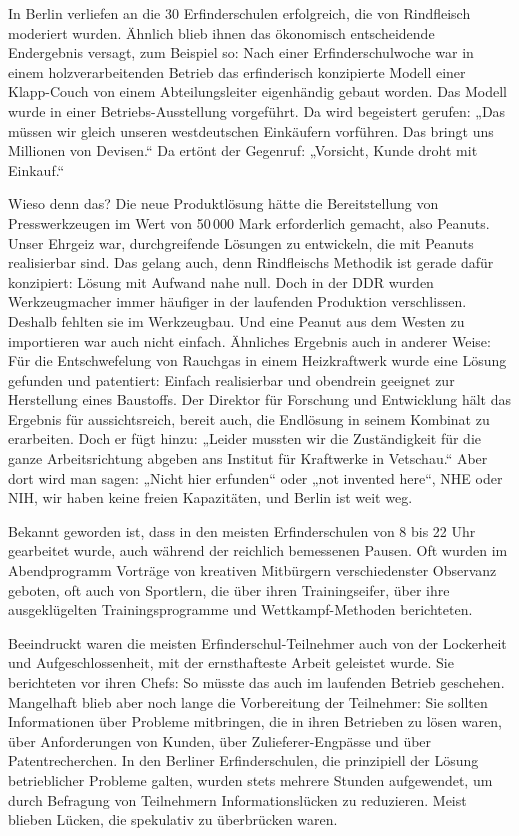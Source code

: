 \documentclass[12pt,a4paper]{article}
\begin{document}
In Berlin verliefen an die 30 Erfinderschulen erfolgreich, die von Rindfleisch
moderiert wurden. Ähnlich blieb ihnen das ökonomisch entscheidende Endergebnis
versagt, zum Beispiel so: Nach einer Erfinderschulwoche war in einem
holzverarbeitenden Betrieb das erfinderisch konzipierte Modell einer
Klapp-Couch von einem Abteilungsleiter eigenhändig gebaut worden. Das Modell
wurde in einer Betriebs-Ausstellung vorgeführt. Da wird begeistert gerufen:
„Das müssen wir gleich unseren westdeutschen Einkäufern vorführen. Das bringt
uns Millionen von Devisen.“ Da ertönt der Gegenruf: „Vorsicht, Kunde droht mit
Einkauf.“

Wieso denn das? Die neue Produktlösung hätte die Bereitstellung von
Presswerkzeugen im Wert von 50\,000 Mark erforderlich gemacht, also Peanuts.
Unser Ehrgeiz war, durchgreifende Lösungen zu entwickeln, die mit Peanuts
realisierbar sind. Das gelang auch, denn Rindfleischs Methodik ist gerade dafür
konzipiert: Lösung mit Aufwand nahe null. Doch in der DDR wurden Werkzeugmacher
immer häufiger in der laufenden Produktion verschlissen. Deshalb fehlten sie im
Werkzeugbau. Und eine Peanut aus dem Westen zu importieren war auch nicht
einfach. Ähnliches Ergebnis auch in anderer Weise: Für die Entschwefelung von
Rauchgas in einem Heizkraftwerk wurde eine Lösung gefunden und patentiert:
Einfach realisierbar und obendrein geeignet zur Herstellung eines Baustoffs.
Der Direktor für Forschung und Entwicklung hält das Ergebnis für
aussichtsreich, bereit auch, die Endlösung in seinem Kombinat zu erarbeiten.
Doch er fügt hinzu: „Leider mussten wir die Zuständigkeit für die ganze
Arbeitsrichtung abgeben ans Institut für Kraftwerke in Vetschau.“ Aber dort
wird man sagen: „Nicht hier erfunden“ oder „not invented here“, NHE oder NIH,
wir haben keine freien Kapazitäten, und Berlin ist weit weg.

Bekannt geworden ist, dass in den meisten Erfinderschulen von 8 bis 22 Uhr
gearbeitet wurde, auch während der reichlich bemessenen Pausen. Oft wurden im
Abendprogramm Vorträge von kreativen Mitbürgern verschiedenster Observanz
geboten, oft auch von Sportlern, die über ihren Trainingseifer, über ihre
ausgeklügelten Trainingsprogramme und Wettkampf-Methoden berichteten.

Beeindruckt waren die meisten Erfinderschul-Teilnehmer auch von der Lockerheit
und Aufgeschlossenheit, mit der ernsthafteste Arbeit geleistet wurde. Sie
berichteten vor ihren Chefs: So müsste das auch im laufenden Betrieb geschehen.
Mangelhaft blieb aber noch lange die Vorbereitung der Teilnehmer: Sie sollten
Informationen über Probleme mitbringen, die in ihren Betrieben zu lösen waren,
über Anforderungen von Kunden, über Zulieferer-Engpässe und über
Patentrecherchen.  In den Berliner Erfinderschulen, die prinzipiell der Lösung
betrieblicher Probleme galten, wurden stets mehrere Stunden aufgewendet, um
durch Befragung von Teilnehmern Informationslücken zu reduzieren. Meist blieben
Lücken, die spekulativ zu überbrücken waren.
\end{document}

